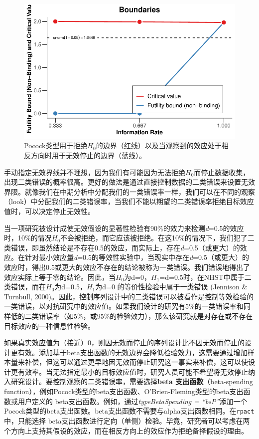 \documentclass[
  letterpaper,
  DIV=11,
  numbers=noendperiod]{scrreprt}
\begin{document}
\begin{figure}

{\centering \includegraphics[width=1\textwidth,height=\textheight]{10-sequential_files/figure-pdf/fig-futility1-1.pdf}

}

\caption{\label{fig-futility1}Pocock类型用于拒绝\(H_0\)的边界（红线）以及当观察到的效应处于相反方向时用于无效停止的边界（蓝线）。}

\end{figure}

手动指定无效界线并不理想，因为我们有可能因为无法拒绝\(H_0\)而停止数据收集，出现二类错误的概率很高。更好的做法是通过直接控制数据的二类错误来设置无效界限。就像我们在中期分析中分配我们的一类错误率一样，我们可以在不同的观察（look）中分配我们的二类错误率，当我们不能以期望的二类错误率拒绝目标效应值时，可以决定停止无效性。

当一项研究被设计成使无效假设的显著性检验有90\%的效力来检测\emph{d}=0.5的效应时，10\%的情况\(H_0\)不会被拒绝，而它应该被拒绝。在这10\%的情况下，我们犯了二类错误，即虽然结论是不存在0.5的效应，而实际上，存在\emph{d}=0.5（或更大）的效应。在针对最小效应量\emph{d}=0.5的等效性实验中，当现实中存在\emph{d}=0.5（或更大）的效应时，得出0.5或更大的效应不存在的结论被称为一类错误。我们错误地得出了效应实际上等于零的结论。因此，当\(H_0\)为d=0，\(H_1\)=d=0.5时，在NHST中属于二类错误，而在\(H_0\)为d=0.5，\(H_1\)为d=0
的等价性检验中属于一类错误 (Jennison \& Turnbull,
2000)。因此，控制序列设计中的二类错误可以被看作是控制等效检验的一类错误，以对抗研究中的效应值。如果我们设计的研究有5\%的一类错误率和同样低的二类错误率（如5\%，或95\%的检验效力），那么该研究就是对存在或不存在目标效应的一种信息性检验。

如果真实效应值为（接近）0，则因无效而停止的序列设计比不因无效而停止的设计更有效。添加基于beta支出函数的无效边界会降低检验效力，这需要通过增加样本量来补偿，但这可以通过更早地因无效而停止研究这一事实来补偿，这可以使设计更有效率。当无法指定最小的目标效应值时，研究人员可能不希望将无效停止纳入研究设计。要控制观察的二类错误率，需要选择\textbf{beta
支出函数}（beta-spending
function），例如Pocock类型的beta支出函数、O'Brien-Fleming类型的beta支出函数或用户定义的
beta支出函数。例如，通过\emph{typeBetaSpending =
``bsP''}添加一个Pocock类型的beta支出函数。beta支出函数不需要与alpha支出函数相同。在\texttt{rpact}中，只能选择
beta支出函数进行定向（单侧）检验。毕竟，研究者可以考虑在两个方向上支持其假设的效应，而在相反方向上的效应作为拒绝备择假设的理由。
\end{document}
